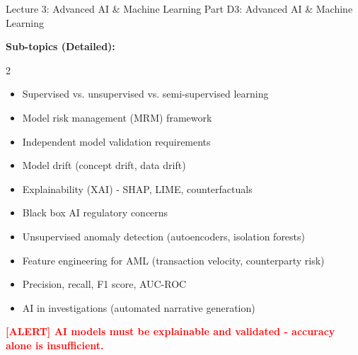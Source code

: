 \documentclass[11pt,a4paper]{beamer}
\newcommand{\redflag}[1]{\textcolor{red}{\textbf{[ALERT] #1}}}
\begin{document}
\begin{frame}{Lecture 3: Advanced AI \& Machine Learning}
	\centering
	\Large Part D3: Advanced AI \& Machine Learning
	\vspace{0.3cm}
	
	\textbf{Sub-topics (Detailed):}
	\begin{multicols}{2}
		\begin{itemize}
			\item Supervised vs. unsupervised vs. semi-supervised learning
			\item Model risk management (MRM) framework
			\item Independent model validation requirements
			\item Model drift (concept drift, data drift)
			\item Explainability (XAI) - SHAP, LIME, counterfactuals
			\item Black box AI regulatory concerns
			\item Unsupervised anomaly detection (autoencoders, isolation forests)
			\item Feature engineering for AML (transaction velocity, counterparty risk)
			\item Precision, recall, F1 score, AUC-ROC
			\item AI in investigations (automated narrative generation)
		\end{itemize}
	\end{multicols}
	\redflag{AI models must be explainable and validated - accuracy alone is insufficient.}
\end{frame}
\end{document}
